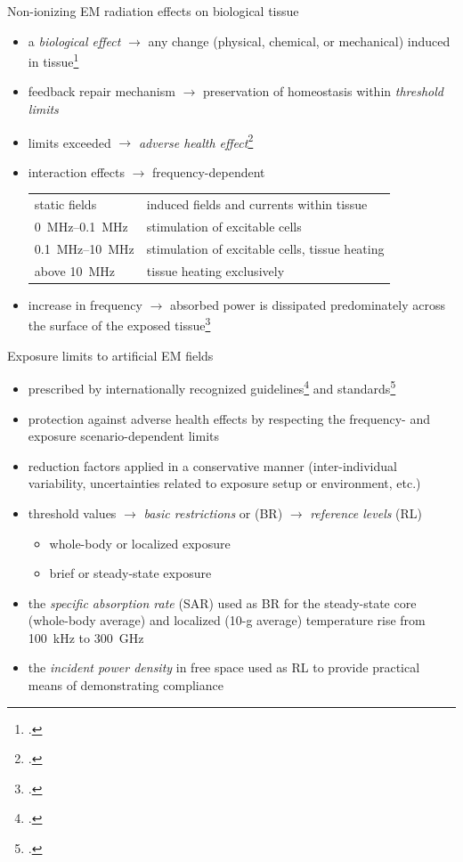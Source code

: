 \documentclass[xcolor=dvipsnames,10pt]{beamer}
\begin{document}
\begin{frame}{Non-ionizing EM radiation effects
on biological tissue}
    \begin{itemize}
        \item a \emph{biological effect} $\rightarrow$ any change (physical, chemical, or mechanical) induced in tissue\footcite{ICNIRP2020Principles}
        \item feedback repair mechanism $\rightarrow$ preservation of homeostasis within \emph{threshold limits}
        \item limits exceeded $\rightarrow$ \emph{adverse health effect}\footcite{WHO2022Health}
        \item interaction effects $\rightarrow$ frequency-dependent
        \begin{tabular}{p{2.7cm}p{8cm}}
            static fields & induced fields and currents within tissue\\
            \SIrange{0}{0.1}{\MHz} & stimulation of excitable cells\\
            \SIrange{0.1}{10}{\MHz} & stimulation of excitable cells, tissue heating\\
            above \SI{10}{\MHz} & tissue heating exclusively
        \end{tabular}
        \item increase in frequency $\rightarrow$ absorbed power is dissipated predominately across the surface of the exposed tissue\footcite{Ziskin2018Tissue}
        \end{itemize}
\end{frame}

\begin{frame}{Exposure limits to artificial EM fields}
    \begin{itemize}
        \item prescribed by internationally recognized guidelines\footcite{ICNIRP2020Guidelines} and standards\footcite{IEEE2019Standard}
        \item protection against adverse health effects by respecting the frequency- and exposure scenario-dependent limits
        \item reduction factors applied in a conservative manner (inter-individual variability, uncertainties related to exposure setup or environment, etc.)
        \item threshold values $\rightarrow$ \emph{basic restrictions} or (BR) $\rightarrow$ \emph{reference levels} (RL)
        \begin{itemize}
            \item whole-body or localized exposure
            \item brief or steady-state exposure
        \end{itemize}
        \item the \emph{specific absorption rate} (SAR) used as BR for the steady-state core (whole-body average) and localized (10-g average) temperature rise from \SI{100}{\kHz} to \SI{300}{\GHz}
        \item the \emph{incident power density} in free space used as RL to provide practical means of demonstrating compliance
    \end{itemize}
\end{frame}
\end{document}
